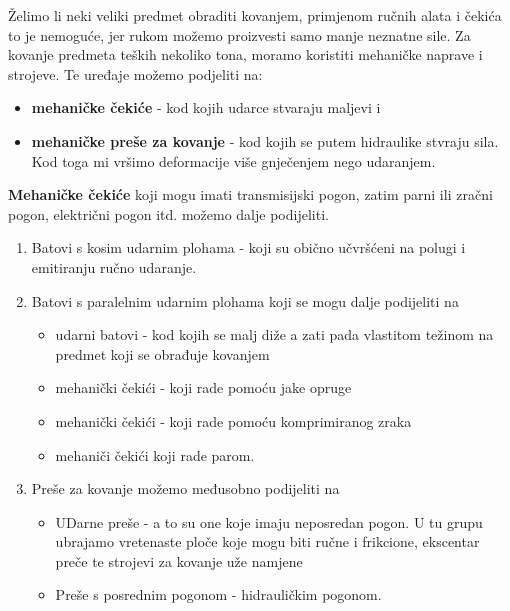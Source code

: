\documentclass[a4paper,12pt]{article}
\numberwithin{figure}{section}
\begin{document}
Želimo li neki veliki predmet obraditi kovanjem, primjenom ručnih alata i čekića to je nemoguće, jer rukom možemo proizvesti samo manje neznatne sile. Za kovanje predmeta teških nekoliko tona, moramo koristiti mehaničke naprave i strojeve. Te uređaje možemo podjeliti na:
\begin{itemize}
\item \textbf{mehaničke čekiće} - kod kojih udarce stvaraju maljevi i
\item \textbf{mehaničke preše za kovanje} - kod kojih se putem hidraulike stvraju sila. Kod toga mi vršimo deformacije više gnječenjem nego udaranjem.
\end{itemize}
\par
\textbf{Mehaničke čekiće} koji mogu imati transmisijski pogon, zatim parni ili zračni pogon, električni pogon itd. možemo dalje podijeliti.
\begin{enumerate}
\item Batovi s kosim udarnim plohama - koji su obično učvršćeni na polugi i emitiranju ručno udaranje.
\item Batovi s paralelnim udarnim plohama koji se mogu dalje podijeliti na 
\begin{itemize}
\item udarni batovi - kod kojih se malj diže a zati pada vlastitom težinom na predmet koji se obrađuje kovanjem
\item mehanički čekići - koji rade pomoću jake opruge
\item mehanički čekići - koji rade pomoću komprimiranog zraka
\item mehaniči čekići koji rade parom.
\end{itemize}
\item Preše za kovanje možemo međusobno podijeliti na 
\begin{itemize}
\item UDarne preše - a to su one koje imaju neposredan pogon. U tu grupu ubrajamo vretenaste ploče koje mogu biti ručne i frikcione, ekscentar preče te strojevi za kovanje uže namjene
\item Preše s posrednim pogonom - hidrauličkim pogonom.
\end{itemize}
\end{enumerate}
\end{document}
